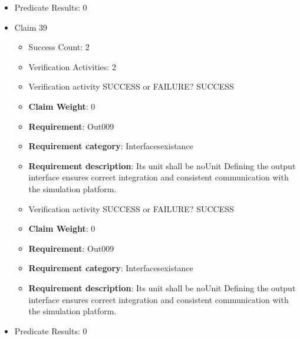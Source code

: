 \documentclass{article}
\begin{document}
\begin{itemize}
\begin{itemize}
					\item Verification activity SUCCESS or FAILURE? SUCCESS
					\item \textbf{Claim Weight}: 0
						\item \textbf{Requirement}: Out008 
						\item \textbf{Requirement category}: Interfacesexistance 
						\item \textbf{Requirement description}: Its unit shall be Nm Defining the output interface ensures correct integration and consistent communication with the simulation platform.
					
				\end{itemize}
				
									    
				\item Predicate Results: 0

  				  \item Claim 39
				\begin{itemize}
			    	\item Success Count: 2 
			    	\item Verification Activities: 2
					\item Verification activity SUCCESS or FAILURE? SUCCESS
					\item \textbf{Claim Weight}: 0
						\item \textbf{Requirement}: Out009 
						\item \textbf{Requirement category}: Interfacesexistance 
						\item \textbf{Requirement description}: Its unit shall be noUnit Defining the output interface ensures correct integration and consistent communication with the simulation platform.
					
					\item Verification activity SUCCESS or FAILURE? SUCCESS
					\item \textbf{Claim Weight}: 0
						\item \textbf{Requirement}: Out009 
						\item \textbf{Requirement category}: Interfacesexistance 
						\item \textbf{Requirement description}: Its unit shall be noUnit Defining the output interface ensures correct integration and consistent communication with the simulation platform.
					
				\end{itemize}
				
									    
				\item Predicate Results: 0


\end{itemize}
\end{document}
